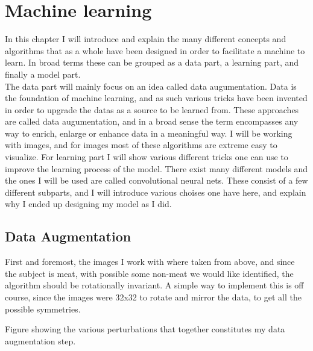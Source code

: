 \chapter{Machine learning}
In this chapter I will introduce and explain the many different concepts and algorithms that as a whole have been designed in order to facilitate a machine to learn.
In broad terms these can be grouped as a data part, a learning part, and finally a model part.\\
The data part will mainly focus on an idea called data augumentation. Data is the foundation of machine learning, and as such various tricks have been invented in order to upgrade the datas as a source to be learned from. These approaches are called data augumentation, and in a broad sense the term encompasses any way to enrich, enlarge or enhance data in a meaningful way. I will be working with images, and for images most of these algorithms are extreme easy to visualize.
For learning part I will show various different tricks one can use to improve the learning process of the model. 
There exist many different models and the ones I will be used are called convolutional neural nets. These consist of a few different subparts, and I will introduce various choises one have here, and explain why I ended up designing my model as I did. 
\cite{lu12in1MultiTaskVision2019}
\cite{dyerAsymptoticsWideNetworks2019}
\cite{izmailovAveragingWeightsLeads2019}
\cite{heBagTricksImage2018}
\cite{engstromExploringLandscapeSpatial2019b}
\cite{tianFCOSFullyConvolutional2019}
\cite{linFocalLossDense2017}

\newpage
\section{Data Augmentation}
First and foremost, the images I work with where taken from above, and since the subject is meat, with possible some non-meat we would like identified, the algorithm should be rotationally invariant. A simple way to implement this is off course, since the images were 32x32 to rotate and mirror the data, to get all the possible symmetries.
\cite{heBagTricksImage2018}
\begin{marginfigure}
\caption{Figure showing the various perturbations that together constitutes my data augmentation step.}
\end{marginfigure} 

